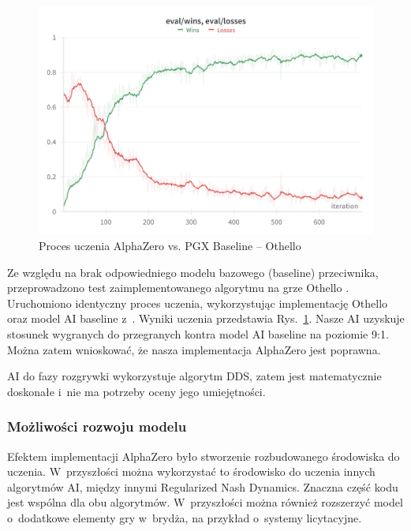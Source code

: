 \begin{figure}[!]
  \centering
  \includegraphics[width=\textwidth]{img/wykresy/othello-eval.png}
  \caption{Proces uczenia AlphaZero vs. PGX Baseline -- Othello}
  \label{fig:othello-eval}
\end{figure}

Ze względu na brak odpowiedniego modelu
bazowego (baseline) przeciwnika,
przeprowadzono test zaimplementowanego algorytmu
na grze Othello \cite{Othello}.
Uruchomiono identyczny proces uczenia,
wykorzystując implementację Othello oraz
model AI baseline z~\cite{PGX}.
Wyniki uczenia przedstawia Rys.~\ref{fig:othello-eval}.
Nasze AI uzyskuje stosunek wygranych do przegranych
kontra model AI baseline na poziomie 9:1.
Można zatem wnioskować, że nasza implementacja
AlphaZero jest poprawna.

AI do fazy rozgrywki wykorzystuje algorytm DDS,
zatem jest matematycznie doskonałe i~nie ma potrzeby
oceny jego umiejętności.

\FloatBarrier

\subsubsection{Możliwości rozwoju modelu}

Efektem implementacji AlphaZero było stworzenie
rozbudowanego środowiska do uczenia.
W~przyszłości można wykorzystać to środowisko
do uczenia innych algorytmów AI, między innymi
Regularized Nash Dynamics.
Znaczna część kodu jest wspólna dla obu algorytmów.
W~przyszłości można również rozszerzyć
model o~dodatkowe elementy gry w~brydża,
na przykład o~systemy licytacyjne.



